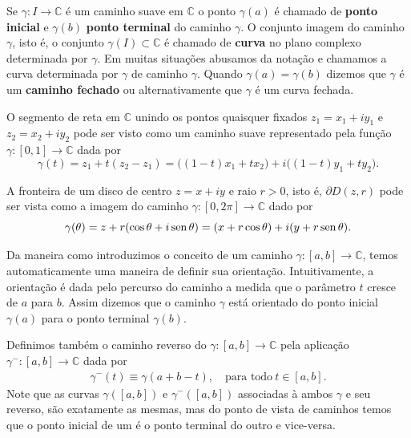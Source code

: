 \bigskip 

Se $\gamma:I\to\mathbb{C}$ é um caminho suave em $\mathbb{C}$ o ponto
$\gamma(a)$ é chamado de {\bf ponto inicial} 
e $\gamma(b)$ {\bf ponto terminal} do 
caminho $\gamma$. O conjunto imagem do caminho $\gamma$, isto é, 
o conjunto $\gamma(I)\subset\mathbb{C}$ é chamado de {\bf curva} no plano complexo
determinada por $\gamma$.
Em muitas situações abusamos da notação e chamamos a curva determinada por $\gamma$
de caminho $\gamma$. 
Quando $\gamma(a)=\gamma(b)$ dizemos que $\gamma$ é um 
{\bf caminho fechado} ou alternativamente que $\gamma$ é
um curva fechada.

\begin{exemplo}\label{exemplo-param-segreta}
O segmento de reta em $\mathbb{C}$ unindo os pontos quaisquer fixados 
$z_1=x_1+iy_1$ e $z_2=x_2+iy_2$
pode ser visto como um caminho suave representado pela função $\gamma:[0,1]\to\mathbb{C}$
dada por 
\[
\gamma(t) = z_1+t(z_2-z_1) = \big((1-t)x_1+tx_2\big)+i\big((1-t)y_1+ty_2\big).
\] 
\end{exemplo}

\begin{exemplo}\label{exemplo-param-circ}
A fronteira de um disco de centro $z=x+iy$ e raio $r>0$, isto é, $\partial D(z,r)$ 
pode ser vista como a imagem do caminho $\gamma:[0,2\pi]\to\mathbb{C}$ dado por
\[
\gamma(\theta) = z+r(\cos\theta+i\operatorname{sen}\theta) = (x+r\cos\theta)+i(y+r\operatorname{sen}\theta).
\]
\end{exemplo}

Da maneira como introduzimos o conceito de um caminho $\gamma:[a,b]\to\mathbb{C}$, 
temos automaticamente uma maneira de definir sua orientação. 
Intuitivamente, a orientação é dada pelo percurso 
do caminho a medida que o parâmetro $t$ cresce de $a$ para $b$. 
Assim dizemos que o caminho $\gamma$ está orientado do ponto 
inicial $\gamma(a)$ para o ponto terminal $\gamma(b)$. 

Definimos também o caminho reverso do $\gamma:[a,b]\to\mathbb{C}$
pela aplicação $\gamma^{-}:[a,b]\to\mathbb{C}$ dada por 
\begin{align}\label{formula-caminho-reverso}
\gamma^{-}(t) \equiv \gamma(a+b-t), \quad \text{para todo}\ t\in[a,b].
\end{align}
Note que as curvas $\gamma([a,b])$ e $\gamma^{-}([a,b])$ associadas à ambos $\gamma$ e seu reverso, 
são exatamente as mesmas, mas do ponto de vista de caminhos temos que o ponto inicial de um é o ponto 
terminal do outro e vice-versa. 


